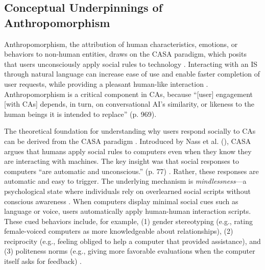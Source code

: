 \documentclass[manuscript,anonymous,sigconf]{acmart}
\begin{document}
\subsection{Conceptual Underpinnings of Anthropomorphism}

Anthropomorphism, the attribution of human characteristics, emotions, or behaviors to non-human entities, draws on the CASA paradigm, which posits that users unconsciously apply social rules to technology \citep{nass1994computers}. Interacting with an IS through natural language can increase ease of use and enable faster completion of user requests, while providing a pleasant human-like interaction \citep{diederich_design_2022}. Anthropomorphism is a critical component in CAs, because ``[user] engagement [with CAs] depends, in turn, on conversational AI’s similarity, or likeness to the human beings it is intended to replace'' \citep{chandra_be_2022} (p. 969).

The theoretical foundation for understanding why users respond socially to CAs can be derived from the CASA paradigm \citep{nass2000researching}. Introduced by Nass et al. (\citeyear{nass1994computers}), CASA argues that humans apply social rules to computers even when they know they are interacting with machines. The key insight was that social responses to computers ``are automatic and
unconscious.'' (p. 77) \citep{nass1994computers}. Rather, these responses are automatic and easy to trigger. The underlying mechanism is \textit{mindlessness}---a psychological state where individuals rely on overlearned social scripts without conscious awareness \citep{nass2000machines}. When computers display minimal social cues such as language or voice, users automatically apply human-human interaction scripts. These cued behaviors include, for example, (1) gender stereotyping (e.g., rating female-voiced computers as more knowledgeable about relationships), (2) reciprocity (e.g., feeling obliged to help a computer that provided assistance), and (3) politeness norms (e.g., giving more favorable evaluations when the computer itself asks for feedback) \citep{nass1997machines}. 
\end{document}
